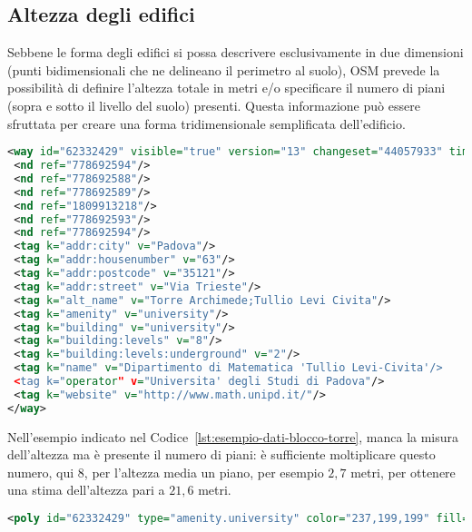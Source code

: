 \subsection{Altezza degli edifici}\label{subsec:altezza-edifici}
Sebbene le forma degli edifici si possa descrivere esclusivamente in due dimensioni (punti bidimensionali che ne delineano il perimetro al suolo),
OSM prevede la possibilità di definire l'altezza totale in metri e/o specificare il numero di piani (sopra e sotto il livello del suolo)
presenti.
Questa informazione può essere sfruttata per creare una forma tridimensionale semplificata dell'edificio.
%
\begin{lstlisting}[language=XML,style=mystyle,numbers=none,label={lst:esempio-dati-blocco-torre},caption={Esempio di informazioni di un edificio estratte da OSM.}]
<way id="62332429" visible="true" version="13" changeset="44057933" timestamp="2016-11-30T11:53:34Z" user="Agno-phi" uid="731498" >
 <nd ref="778692594"/>
 <nd ref="778692588"/>
 <nd ref="778692589"/>
 <nd ref="1809913218"/>
 <nd ref="778692593"/>
 <nd ref="778692594"/>
 <tag k="addr:city" v="Padova"/>
 <tag k="addr:housenumber" v="63"/>
 <tag k="addr:postcode" v="35121"/>
 <tag k="addr:street" v="Via Trieste"/>
 <tag k="alt_name" v="Torre Archimede;Tullio Levi Civita"/>
 <tag k="amenity" v="university"/>
 <tag k="building" v="university"/>
 <tag k="building:levels" v="8"/>
 <tag k="building:levels:underground" v="2"/>
 <tag k="name" v="Dipartimento di Matematica 'Tullio Levi-Civita'/>
 <tag k="operator" v="Universita' degli Studi di Padova"/>
 <tag k="website" v="http://www.math.unipd.it/"/>
</way>
\end{lstlisting}
%
Nell'esempio indicato nel Codice~\ref{lst:esempio-dati-blocco-torre}, manca la misura dell'altezza ma è presente
il numero di piani: è sufficiente moltiplicare questo numero, qui $8$, per l'altezza media un piano, per esempio $2,7$ metri,
per ottenere una stima dell'altezza pari a $21,6$ metri.
%
\begin{lstlisting}[language=XML,style=mystyle,numbers=none,linewidth=\textwidth,label={lst:esempio-poly-blocco-torre},caption={Forma di un edificio estratta da OSM e convertita con Polyconvert con l'aggiunta dell'altezza.}]
<poly id="62332429" type="amenity.university" color="237,199,199" fill="1" layer="-1.00" height="21.6" shape="79.68,73.38 119.66,61.39 108.52,24.49 88.84,30.39 68.53,36.48 79.68,73.38" />
\end{lstlisting}
%
%
